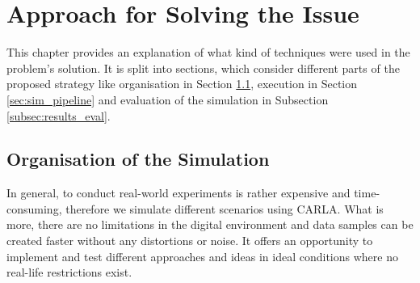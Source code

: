 \chapter{Approach for Solving the Issue} \label{approach}

This chapter provides an explanation of what kind of techniques were used in the problem's solution. It is split into sections, which consider different parts of the proposed strategy like organisation in Section \ref{sec:orga_sim}, execution in Section \ref{sec:sim_pipeline} and evaluation of the simulation in Subsection \ref{subsec:results_eval}.

\section{Organisation of the Simulation} \label{sec:orga_sim}
In general, to conduct real-world experiments is rather expensive and time-consuming, therefore we simulate different scenarios using CARLA. What is more, there are no limitations in the digital environment and data samples can be created faster without any distortions or noise. It offers an opportunity to implement and test different approaches and ideas in ideal conditions where no real-life restrictions exist.

